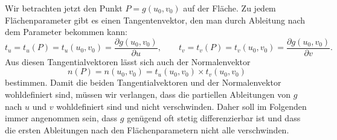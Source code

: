 Wir betrachten jetzt den Punkt $P=g(u_0,v_0)$ auf der Fläche.
Zu jedem Flächenparameter gibt es einen Tangentenvektor, den man durch
Ableitung nach dem Parameter bekommen kann:
\begin{equation}
t_u
=
t_u(P)
=
t_u(u_0,v_0)
=
\frac{\partial g(u_0,v_0)}{\partial u},
\qquad
t_v
=
t_v(P)
=
t_v(u_0,v_0)
=
\frac{\partial g(u_0,v_0)}{\partial v}.
\end{equation}
Aus diesen Tangentialvektoren lässt sich auch der Normalenvektor
\begin{equation}
n(P) = n(u_0,v_0) = t_u(u_0,v_0) \times t_v(u_0,v_0)
\end{equation}
bestimmen.
Damit die beiden Tangentialvektoren und der Normalenvektor wohldefiniert sind,
müssen wir verlangen, dass die partiellen Ableitungen von $g$ nach $u$ und $v$
wohldefiniert sind und nicht verschwinden.
Daher soll im Folgenden immer angenommen sein, dass $g$ genügend oft stetig
differenzierbar ist und dass die ersten Ableitungen nach den Flächenparametern
nicht alle verschwinden.

